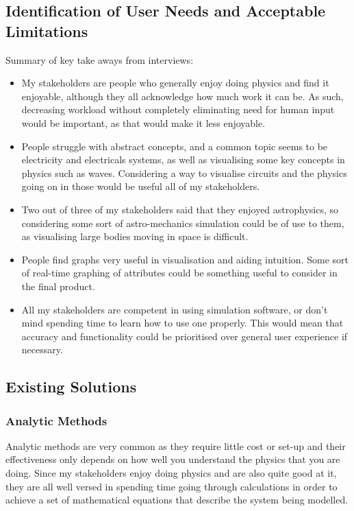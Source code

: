 \documentclass[11pt]{article}
\begin{document}
        \subsection{Identification of User Needs and Acceptable Limitations}
            Summary of key take aways from interviews:
            \begin{itemize}
                \item My stakeholders are people who generally enjoy doing physics and find it enjoyable, although they all acknowledge how much work it can be. As such, decreasing workload without completely eliminating need for human input would be important, as that would make it less enjoyable.
                \item People struggle with abstract concepts, and a common topic seems to be electricity and electricals systems, as well as visualising some key concepts in physics such as waves. Considering a way to visualise circuits and the physics going on in those would be useful all of my stakeholders.
                \item Two out of three of my stakeholders said that they enjoyed astrophysics, so considering some sort of astro-mechanics simulation could be of use to them, as visualising large bodies moving in space is difficult.
                \item People find graphs very useful in visualisation and aiding intuition. Some sort of real-time graphing of attributes could be something useful to consider in the final product.
                \item All my stakeholders are competent in using simulation software, or don't mind spending time to learn how to use one properly. This would mean that accuracy and functionality could be prioritised over general user experience if necessary. 
            \end{itemize}

        \subsection{Existing Solutions}
        \subsubsection{Analytic Methods}
            Analytic methods are very common as they require little cost or set-up and their effectiveness only depends on how well you understand the physics that you are doing. Since my stakeholders enjoy doing physics and are also quite good at it, they are all well versed in spending time going through calculations in order to achieve a set of mathematical equations that describe the system being modelled. 
\end{document}
